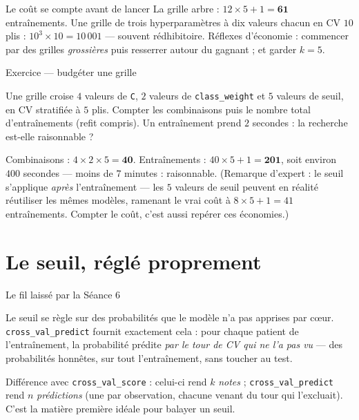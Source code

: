 \documentclass[aspectratio=169,11pt]{beamer}
\begin{document}
\begin{frame}{Le coût se compte avant de lancer}
{\small La grille arbre : $12 \times 5 + 1 = \mathbf{61}$ entraînements. Une grille de trois hyperparamètres à dix valeurs chacun en CV $10$ plis : $10^3 \times 10 = 10\,001$ — souvent rédhibitoire. Réflexes d'économie : commencer par des grilles \emph{grossières} puis resserrer autour du gagnant ; et garder $k = 5$.}
\end{frame}

\begin{frame}{Exercice — budgéter une grille}
\begin{ucadrec}[Énoncé]
{\small Une grille croise $4$ valeurs de \texttt{C}, $2$ valeurs de \texttt{class\_weight} et $5$ valeurs de seuil, en CV stratifiée à $5$ plis. Compter les combinaisons puis le nombre total d'entraînements (refit compris). Un entraînement prend $2$ secondes : la recherche est-elle raisonnable ?}
\end{ucadrec}
\pause
\begin{ucadex}[Correction]
{\small Combinaisons : $4 \times 2 \times 5 = \mathbf{40}$. Entraînements : $40 \times 5 + 1 = \mathbf{201}$, soit environ $400$ secondes — moins de $7$ minutes : raisonnable. (Remarque d'expert : le seuil s'applique \emph{après} l'entraînement — les $5$ valeurs de seuil peuvent en réalité réutiliser les mêmes modèles, ramenant le vrai coût à $8 \times 5 + 1 = 41$ entraînements. Compter le coût, c'est aussi repérer ces économies.)}
\end{ucadex}
\end{frame}

\section{Le seuil, réglé proprement}

\begin{frame}{Le fil laissé par la Séance 6}
\begin{ucaddef}
{\small Le seuil se règle sur des probabilités que le modèle n'a pas apprises par cœur. \texttt{cross\_val\_predict} fournit exactement cela : pour chaque patient de l'entraînement, la probabilité prédite \emph{par le tour de CV qui ne l'a pas vu} — des probabilités honnêtes, sur tout l'entraînement, sans toucher au test.}
\end{ucaddef}
{\small Différence avec \texttt{cross\_val\_score} : celui-ci rend $k$ \emph{notes} ; \texttt{cross\_val\_predict} rend $n$ \emph{prédictions} (une par observation, chacune venant du tour qui l'excluait). C'est la matière première idéale pour balayer un seuil.}
\end{frame}
\end{document}
